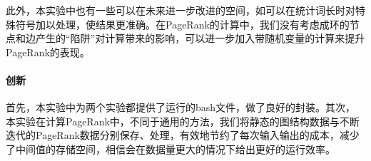 \documentclass{article}
\begin{document}
此外，本实验中也有一些可以在未来进一步改进的空间，如可以在统计词长时对特殊符号加以处理，使结果更准确。在PageRank的计算中，我们没有考虑成环的节点和边产生的“陷阱”对计算带来的影响，可以进一步加入带随机变量的计算来提升PageRank的表现。

\paragraph{创新}

首先，本实验中为两个实验都提供了运行的bash文件，做了良好的封装。其次，本实验在计算PageRank中，不同于通用的方法，我们将静态的图结构数据与不断迭代的PageRank数据分别保存、处理，有效地节约了每次输入输出的成本，减少了中间值的存储空间，相信会在数据量更大的情况下给出更好的运行效率。
\end{document}
